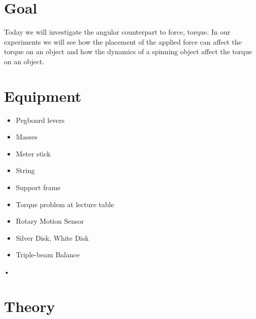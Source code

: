 \documentclass[main.tex]{subfiles}
\begin{document}
\section*{Goal}
Today we will investigate the angular counterpart to force, torque. In our experiments we will see how the placement of the applied force can affect the torque on an object and how the dynamics of a spinning object affect the torque on an object.

\section*{Equipment}
\begin{itemize}
\item
Pegboard levers
\item
Masses
\item
Meter stick
\item
String
\item
Support frame
\item
Torque problem at lecture table
\item
Rotary Motion Sensor
\item
Silver Disk, White Disk
\item
Triple-beam Balance
\end{itemize}•

\section*{Theory}

\begin{figure}
\centering
{}
\caption{} \label{fig:Torque}
\end{figure} \vspace{-10pt}
\end{document}
